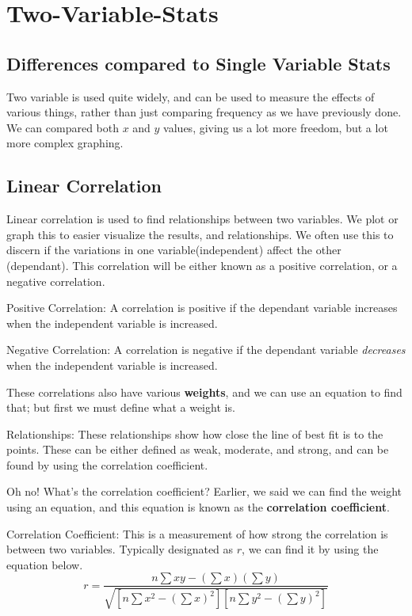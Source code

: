 \section{Two-Variable-Stats}

    \subsection{Differences compared to Single Variable Stats}
    Two variable is used quite widely, and can be used to measure the effects of various things, rather than just comparing frequency as we have previously done.
    We can compared both $x$ and $y$ values, giving us a lot more freedom, but a lot more complex graphing.
    
    \subsection{Linear Correlation}
    Linear correlation is used to find relationships between two variables. 
    We plot or graph this to easier visualize the results, and relationships.
    We often use this to discern if the variations in one variable(independent) affect the other (dependant). 
    This correlation will be either known as a positive correlation, or a negative correlation. 
    \begin{definition}
        Positive Correlation: A correlation is positive if the dependant variable increases when the independent variable is increased. 
    \end{definition}
    \begin{definition}
        Negative Correlation: A correlation is negative if the dependant variable \emph{decreases} when the independent variable is increased.
    \end{definition}
    These correlations also have various \textbf{weights}, and we can use an equation to find that; but first we must define what a weight is.
    \begin{definition}
       Relationships: These relationships show how close the line of best fit is to the points. These can be either defined as weak, moderate, and strong, and can be found by using the correlation coefficient.
    \end{definition}
    Oh no! What's the correlation coefficient? Earlier, we said we can find the weight using an equation, and this equation is known as the \textbf{correlation coefficient}.
    \begin{definition}
        Correlation Coefficient: This is a measurement of how strong the correlation is between two variables. Typically designated as $r$, we can find it by using the equation below.
        \begin{equation*}
            r = \frac{n\sum xy - (\sum x)(\sum y)}{\sqrt{[n\sum x^{2}-(\sum x)^{2}][n\sum y^{2}-(\sum y)^{2}]}}
        \end{equation*}
    \end{definition}

